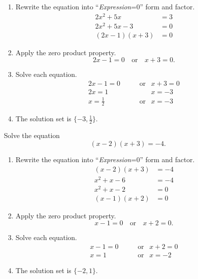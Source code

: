 \documentclass[en,12pt]{elegantbook}
\providecommand{\tightlist}{%
  \setlength{\itemsep}{0pt}\setlength{\parskip}{0pt}}
\providecommand{\tightlist}{%
  \setlength{\itemsep}{0pt}\setlength{\parskip}{0pt}}
\let\BeginKnitrBlock\begin \let\EndKnitrBlock\end
\begin{document}
\BeginKnitrBlock{solution}


\begin{enumerate}
\def\labelenumi{\arabic{enumi}.}
\item
  Rewrite the equation into ``\emph{Expression}=0'' form and factor.
  \[
   \begin{aligned}
       2x^2+5x&=3\\
       2x^2+5x-3&=0\\
       (2x-1)(x+3)&=0
   \end{aligned}
   \]
\item
  Apply the zero product property.
  \[2x-1=0\quad\text{or}\quad x+3=0.\]
\item
  Solve each equation.
  \[
   \begin{aligned}
       2x-1 =0       & \qquad\text{or} & x+3 =0  \\
       2x   =1       &    & x   =-3 \\
       x    =\frac12 & \qquad\text{or} & x   =-3
   \end{aligned}
   \]
\item
  The solution set is \(\{-3, \frac12\}\).
\end{enumerate}
\EndKnitrBlock{solution}

\BeginKnitrBlock{example}
\protect\hypertarget{exm:unnamed-chunk-113}{}{\label{exm:unnamed-chunk-113} }
Solve the equation
\[(x-2)(x+3)=-4.\]
\EndKnitrBlock{example}

\BeginKnitrBlock{solution}


\begin{enumerate}
\def\labelenumi{\arabic{enumi}.}
\tightlist
\item
  Rewrite the equation into ``\emph{Expression}=0'' form and factor.
  \[
   \begin{aligned}
       (x-2)(x+3)&=-4\\
       x^2+x-6&=-4\\
       x^2+x-2&=0\\
       (x-1)(x+2)&=0
   \end{aligned}
   \]
\item
  Apply the zero product property.
  \[x-1=0\quad\text{or}\quad x+2=0.\]
\item
  Solve each equation.
  \[
   \begin{aligned}
       x-1 =0 & \qquad\text{or} & x+2 =0  \\
       x   =1 & \qquad\text{or} & x   =-2
   \end{aligned}
   \]
\item
  The solution set is \(\{-2, 1\}\).
\end{enumerate}
\EndKnitrBlock{solution}
\end{document}
